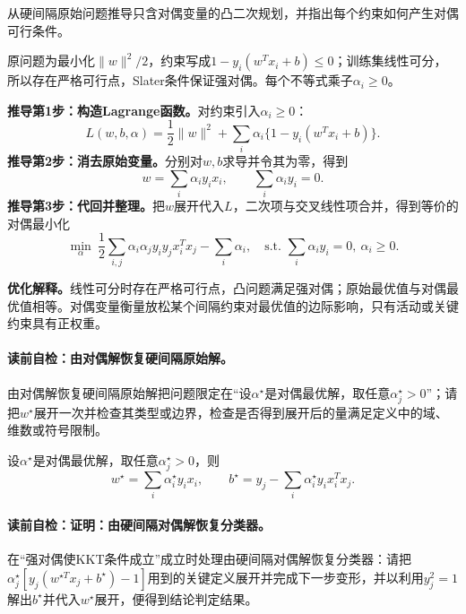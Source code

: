 \begin{derivationgoalbox}
从硬间隔原始问题推导只含对偶变量的凸二次规划，并指出每个约束如何产生对偶可行条件。
\end{derivationgoalbox}
\begin{derivationprepbox}
原问题为最小化$\lVert w\rVert^2/2$，约束写成$1-y_i(w^Tx_i+b)\leq0$；训练集线性可分，所以存在严格可行点，Slater条件保证强对偶。每个不等式乘子$\alpha_i\geq0$。
\end{derivationprepbox}
\textbf{推导第1步：构造Lagrange函数。}对约束引入$\alpha_i\geq0$：
\[
L(w,b,\alpha)=\frac12\lVert w\rVert^2
+\sum_i\alpha_i\{1-y_i(w^Tx_i+b)\}.
\]
\textbf{推导第2步：消去原始变量。}分别对$w,b$求导并令其为零，得到
\[
w=\sum_i\alpha_i y_i x_i,\qquad \sum_i\alpha_i y_i=0.
\]
\textbf{推导第3步：代回并整理。}把$w$展开代入$L$，二次项与交叉线性项合并，得到等价的对偶最小化
\[
\min_\alpha\ \frac12\sum_{i,j}\alpha_i\alpha_jy_iy_jx_i^Tx_j-\sum_i\alpha_i,
\quad
\text{s.t. }\sum_i\alpha_iy_i=0,\ \alpha_i\geq0.
\]

\label{struct:V3-C02-CH16}
\begin{optimizationbox}
\textbf{优化解释。}线性可分时存在严格可行点，凸问题满足强对偶；原始最优值与对偶最优值相等。对偶变量衡量放松某个间隔约束对最优值的边际影响，只有活动或关键约束具有正权重。
\end{optimizationbox}

\paragraph{读前自检：由对偶解恢复硬间隔原始解。}由对偶解恢复硬间隔原始解把问题限定在“设$\alpha^\star$是对偶最优解，取任意$\alpha_j^\star>0$”；请把$w^\star$展开一次并检查其类型或边界，检查是否得到展开后的量满足定义中的域、维数或符号限制。\par

\label{struct:V3-C02-CH15}
\begin{theorem}[由硬间隔对偶解恢复分类器]\label{thm:V3-C02-dual-recovery}
设$\alpha^\star$是对偶最优解，取任意$\alpha_j^\star>0$，则
\[
w^\star=\sum_i\alpha_i^\star y_ix_i,\qquad
b^\star=y_j-\sum_i\alpha_i^\star y_i x_i^Tx_j.
\]
\end{theorem}
\paragraph{读前自检：证明：由硬间隔对偶解恢复分类器。}在“强对偶使KKT条件成立”成立时处理由硬间隔对偶解恢复分类器：请把$\alpha_j^\star[y_j(w^{\star T}x_j+b^\star)-1]$用到的关键定义展开并完成下一步变形，并以利用$y_j^2=1$解出$b^\star$并代入$w^\star$展开，便得到结论判定结果。\par

